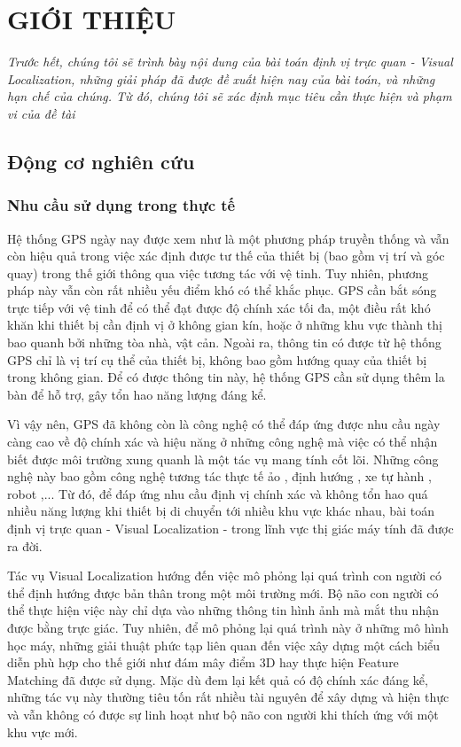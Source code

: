 \chapter{GIỚI THIỆU}

\textit{Trước hết, chúng tôi sẽ trình bày nội dung của bài toán định vị trực quan - Visual Localization, những giải pháp đã được đề xuất hiện nay của bài toán, và những hạn chế của chúng. Từ đó, chúng tôi sẽ xác định mục tiêu cần thực hiện và phạm vi của đề tài}

\section{Động cơ nghiên cứu}

\subsection{Nhu cầu sử dụng trong thực tế}

Hệ thống GPS ngày nay được xem như là một phương pháp truyền thống và vẫn còn hiệu quả trong việc xác định được tư thế của thiết bị (bao gồm vị trí và góc quay) trong thế giới thông qua việc tương tác với vệ tinh. Tuy nhiên, phương pháp này vẫn còn rất nhiều yếu điểm khó có thể khắc phục. GPS cần bắt sóng trực tiếp với vệ tinh để có thể đạt được độ chính xác tối đa, một điều rất khó khăn khi thiết bị cần định vị ở không gian kín, hoặc ở những khu vực thành thị bao quanh bởi những tòa nhà, vật cản. Ngoài ra, thông tin có được từ hệ thống GPS chỉ là vị trí cụ thể của thiết bị, không bao gồm hướng quay của thiết bị trong không gian. Để có được thông tin này, hệ thống GPS cần sử dụng thêm la bàn để hỗ trợ, gây tổn hao năng lượng đáng kể.

Vì vậy nên, GPS đã không còn là công nghệ có thể đáp ứng được nhu cầu ngày càng cao về độ chính xác và hiệu năng ở những công nghệ mà việc có thể nhận biết được môi trường xung quanh là một tác vụ mang tính cốt lõi. Những công nghệ này bao gồm công nghệ tương tác thực tế ảo \cite{middelberg2014scalable}, định hướng \cite{sarlin2023orienternet}, xe tự hành \cite{chaabane2021end}, robot \cite{sunderhauf2015place},... Từ đó, để đáp ứng nhu cầu định vị chính xác và không tổn hao quá nhiều năng lượng khi thiết bị di chuyển tới nhiều khu vực khác nhau, bài toán định vị trực quan - Visual Localization - trong lĩnh vực thị giác máy tính đã được ra đời.

Tác vụ Visual Localization hướng đến việc mô phỏng lại quá trình con người có thể định hướng được bản thân trong một môi trường mới. Bộ não con người có thể thực hiện việc này chỉ dựa vào những thông tin hình ảnh mà mắt thu nhận được bằng trực giác. Tuy nhiên, để mô phỏng lại quá trình này ở những mô hình học máy, những giải thuật phức tạp liên quan đến việc xây dựng một cách biểu diễn phù hợp cho thế giới như đám mây điểm 3D hay thực hiện Feature Matching đã được sử dụng. Mặc dù đem lại kết quả có độ chính xác đáng kể, những tác vụ này thường tiêu tốn rất nhiều tài nguyên để xây dựng và hiện thực và vẫn không có được sự linh hoạt như bộ não con người khi thích ứng với một khu vực mới.

